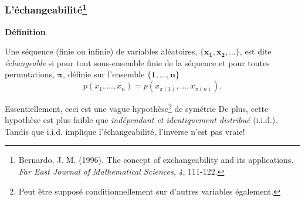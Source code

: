 \documentclass{beamer}
\begin{document}

\begin{frame}
    \frametitle{L'échangeabilité\footnote{
        Bernardo, J. M. (1996).
        The concept of exchangeability and its applications.
        \emph{Far East Journal of Mathematical Sciences}, \emph{4}, 111-122.
    }}
    \textbf{Définition}

    \pause

    \vfill

    Une séquence (finie ou infinie) de variables aléatoires, $\boldsymbol{\{x_1, x_2, \ldots\}}$,
    est dite \emph{échangeable} si pour tout sous-ensemble finie de la séquence
    et pour toutes permutations, $\boldsymbol{\pi}$, définie sur l'ensemble $\boldsymbol{\{1, \ldots, n\}}$
    \[p(x_1, \ldots, x_n) = p(x_{\pi(1)}, \ldots, x_{\pi(n)}).\]


    \pause

    \vfill

    Essentiellement, ceci est une vague hypothèse\footnote{
    Peut être supposé conditionnellement sur d'autres variables également.} de symétrie \pause
    De plus, cette hypothèse est plus faible que \emph{indépendant et identiquement distribué} (i.i.d.). \pause
    Tandis que i.i.d. implique l'échangeabilité, l'inverse n'est pas vraie!
\end{frame}
\end{document}
